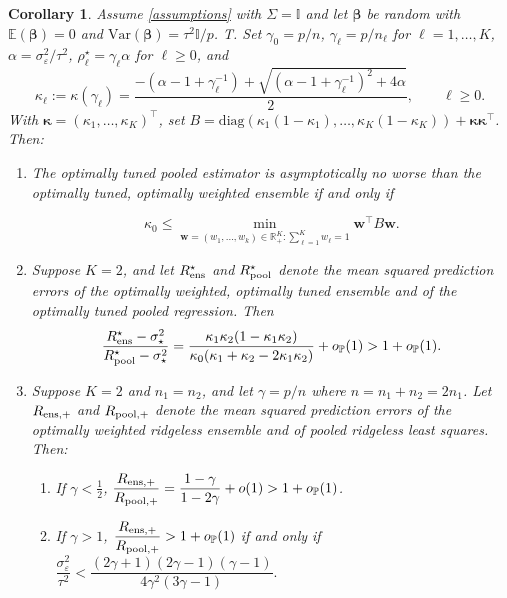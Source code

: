 \documentclass{article}
\theoremstyle{plain}
\newtheorem{corollary}[theorem]{Corollary}
\theoremstyle{remark}
\def \bbeta{\boldsymbol{\beta}}
\def \bbeta{\boldsymbol{\beta}}
\def \I{\mathcal{I}}
\def \E{\mathbb{E}}
\def \P{\mathbb{P}}
\def \I {\mathbb{I}}
\begin{document}
\begin{corollary}\label{cor:comp_k2_iso_re}
Assume \ref{assumptions} with $\Sigma=\I$ and let $\bbeta$ be random with $\E(\bbeta)=0$ and $\mathrm{Var}(\bbeta)=\tau^2\I/p$. T. Set $\gamma_0=p/n$, $\gamma_\ell=p/n_\ell$ for $\ell=1,\ldots,K$, $\alpha=\sigma_\varepsilon^2/\tau^2$, $\rho_\ell^\star=\gamma_\ell\alpha$ for $\ell\ge 0$, and
\[
\kappa_\ell:=\kappa(\gamma_\ell)
=\frac{-(\alpha-1+\gamma_\ell^{-1})+\sqrt{(\alpha-1+\gamma_\ell^{-1})^2+4\alpha}}{2},
\qquad \ell\ge 0.
\]
With $\boldsymbol{\kappa}=(\kappa_1,\ldots,\kappa_K)^\top$, set $B=\mathrm{diag}(\kappa_1(1-\kappa_1),\ldots,\kappa_K(1-\kappa_K))+\boldsymbol{\kappa}\boldsymbol{\kappa}^\top$. Then:
\begin{enumerate}
\item The optimally tuned pooled estimator is asymptotically no worse than the optimally tuned, optimally weighted ensemble if and only if

\[
    \kappa_0
    \le
    \min_{\mathbf{w}=(w_1,\ldots,w_k)\in\mathbb{R}_+^K:\sum\limits_{\ell=1}^Kw_{\ell}=1} \mathbf{w}^\top B\mathbf{w}.
\]

\item Suppose $K=2$, and let $R_{\rm ens}^\star$ and $R_{\rm pool}^\star$ denote the mean squared prediction errors of the optimally weighted, optimally tuned ensemble and of the optimally tuned pooled regression. Then
\[
\frac{R_{\rm ens}^\star-\sigma_\star^2}
     {R_{\rm pool}^\star-\sigma_\star^2}
=\frac{\kappa_1\kappa_2(1-\kappa_1\kappa_2)}
      {\kappa_0(\kappa_1+\kappa_2-2\kappa_1\kappa_2)}+o_\P(1)>1+o_{\P}(1).
\]

\item Suppose $K=2$ and $n_1=n_2$, and let $\gamma=p/n$ where $n=n_1+n_2=2n_1$. Let $R_{\rm ens,+}$ and $R_{\rm pool,+}$ denote the mean squared prediction errors of the optimally weighted ridgeless ensemble and of pooled ridgeless least squares. Then:
\begin{enumerate}
\item If $\gamma<\tfrac{1}{2}$, $\dfrac{R_{\rm ens,+}}{R_{\rm pool,+}}=\dfrac{1-\gamma}{1-2\gamma}+o(1)>1+o_\P(1)$.

\item If $\gamma>1$, $\dfrac{R_{\rm ens,+}}{R_{\rm pool,+}}>1+o_\P(1)$ if and only if
$\dfrac{\sigma_\varepsilon^2}{\tau^2}<\dfrac{(2\gamma+1)(2\gamma-1)(\gamma-1)}{4\gamma^2(3\gamma-1)}.$
\end{enumerate}
\end{enumerate}
\end{corollary}
\end{document}
